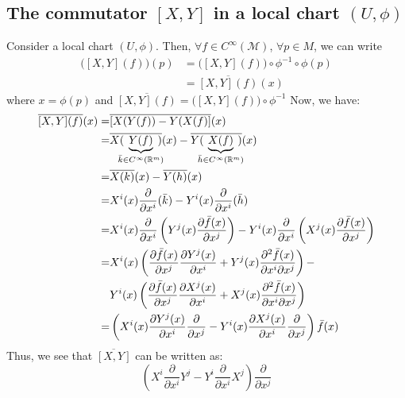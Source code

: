     \subsection{The commutator $[X,Y]$ in a local chart $(U, \phi)$}
      Consider a local chart $(U, \phi)$. Then, $\forall f \in
      C^\infty(\mathcal{M})$, $\forall p \in M$, we can write
      \begin{align*}
        \Big([X,Y](f)\Big)(p) &= \Big([X,Y](f)\Big) \circ \phi^{-1} \circ
        \phi(p) \\
        &= \overline{[X,Y](f)}(x)
      \end{align*}
      where $x = \phi(p)$ and $\overline{[X,Y](f)} = \big([X,Y](f)\big)
      \circ \phi^{-1}$ Now, we have:
      \begin{align*}
        \overline{[X,Y](f)}(x) =& \overline{[X(Y(f)) - Y(X(f)]}(x) \\
        =& \overline{X(\mspace{-10mu}\underbrace{Y(f)}_{\bar{k}\in
          C^\infty(\mathbb{R}^m)}\mspace{-10mu})}(x) -
          \overline{Y(\mspace{-10mu}\underbrace{X(f)}_{\bar{h}\in
          C^\infty(\mathbb{R}^m)}\mspace{-10mu})}(x) \\
        =& \overline{X(k)}(x) - \overline{Y(h)}(x) \\
        =& X^i(x)\frac{\partial}{\partial x^i}(\bar{k}) -
        Y^i(x)\frac{\partial}{\partial x^i}(\bar{h}) \\
        =& X^i(x)\frac{\partial}{\partial x^i}\left( Y^j(x)
        \frac{\partial\bar{f}(x)}{\partial x^j}\right) -
        Y^i(x)\frac{\partial}{\partial x^i}\left( X^j(x)
        \frac{\partial\bar{f}(x)}{\partial x^j}\right) \\
        =& X^i(x)\left(\frac{\partial \bar{f}(x)}{\partial x^j}\frac{\partial
        Y^j(x)}{\partial x^i} + Y^j(x)\frac{\partial^2 \bar{f}(x)}{\partial x^i \partial
        x^j}\right) - \\
        &Y^i(x)\left(\frac{\partial \bar{f}(x)}{\partial
        x^j}\frac{\partial X^j(x)}{\partial x^i} + X^j(x)\frac{\partial^2
        \bar{f}(x)}{\partial x^i \partial x^j}\right) \\
        =& \left(X^i(x) \frac{\partial Y^j(x)}{\partial x^i}
        \frac{\partial}{\partial x^j} - Y^i(x) \frac{\partial
        X^j(x)}{\partial x^i} \frac{\partial}{\partial x^j}\right)\bar{f}(x)
      \end{align*}
      Thus, we see that $\overline{[X,Y]}$ can be written as:
      \begin{equation}
        \label{eqn: commutator in local chart}
        \left(X^i \frac{\partial}{\partial x^i}Y^j - Y^i
        \frac{\partial}{\partial x^i}X^j\right) \frac{\partial}{\partial x^j}
      \end{equation}
